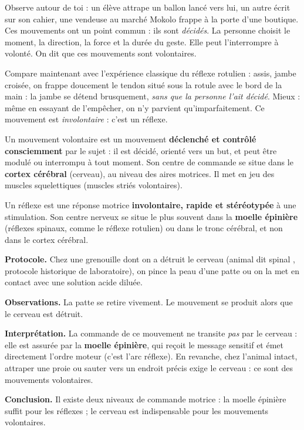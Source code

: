 \documentclass[11pt]{article}
\newcommand{\cle}[1]{{\popxbold\color{popdark}#1}}
\begin{document}
Observe autour de toi : un élève attrape un ballon lancé vers lui, un autre écrit sur son cahier, une vendeuse au marché Mokolo frappe à la porte d'une boutique. Ces mouvements ont un point commun : ils sont \emph{décidés}. La personne choisit le moment, la direction, la force et la durée du geste. Elle peut l'interrompre à volonté. On dit que ces mouvements sont \cle{volontaires}.

Compare maintenant avec l'expérience classique du \cle{réflexe rotulien} : assis, jambe croisée, on frappe doucement le tendon situé sous la rotule avec le bord de la main : la jambe se détend brusquement, \emph{sans que la personne l'ait décidé}. Mieux : même en essayant de l'empêcher, on n'y parvient qu'imparfaitement. Ce mouvement est \emph{involontaire} : c'est un \cle{réflexe}.

\begin{definition}
Un \cle{mouvement volontaire} est un mouvement \textbf{déclenché et contrôlé consciemment} par le sujet : il est décidé, orienté vers un but, et peut être modulé ou interrompu à tout moment. Son centre de commande se situe dans le \textbf{cortex cérébral} (cerveau), au niveau des \cle{aires motrices}. Il met en jeu des muscles squelettiques (muscles striés volontaires).
\end{definition}

\begin{definition}
Un \cle{réflexe} est une réponse motrice \textbf{involontaire, rapide et stéréotypée} à une stimulation. Son centre nerveux se situe le plus souvent dans la \textbf{moelle épinière} (réflexes spinaux, comme le réflexe rotulien) ou dans le tronc cérébral, et non dans le cortex cérébral.
\end{definition}

\begin{experience}
\textbf{Protocole.} Chez une grenouille dont on a détruit le cerveau (animal dit \og spinal \fg, protocole historique de laboratoire), on pince la peau d'une patte ou on la met en contact avec une solution acide diluée.

\textbf{Observations.} La patte se retire vivement. Le mouvement se produit alors que le cerveau est détruit.

\textbf{Interprétation.} La commande de ce mouvement ne transite \emph{pas} par le cerveau : elle est assurée par la \textbf{moelle épinière}, qui reçoit le message sensitif et émet directement l'ordre moteur (c'est l'\cle{arc réflexe}). En revanche, chez l'animal intact, attraper une proie ou sauter vers un endroit précis exige le cerveau : ce sont des mouvements volontaires.

\textbf{Conclusion.} Il existe deux niveaux de commande motrice : la moelle épinière suffit pour les réflexes ; le cerveau est indispensable pour les mouvements volontaires.
\end{experience}
\end{document}
